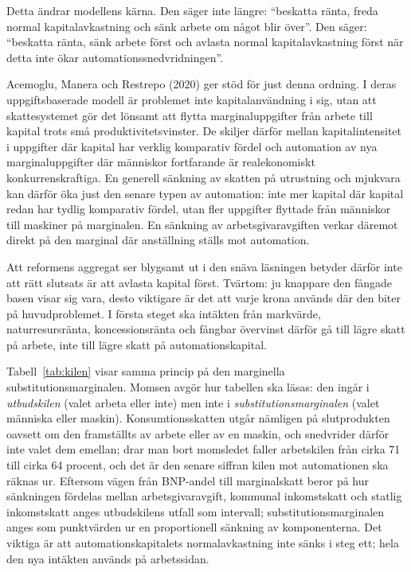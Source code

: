 \documentclass[11pt]{article}
\begin{document}
Detta ändrar modellens kärna. Den säger inte längre: \enquote{beskatta ränta, freda normal kapitalavkastning och sänk arbete om något blir över}. Den säger: \enquote{beskatta ränta, sänk arbete först och avlasta normal kapitalavkastning först när detta inte ökar automationssnedvridningen}.

Acemoglu, Manera och Restrepo (2020) ger stöd för just denna ordning. I deras uppgiftsbaserade modell är problemet inte kapitalanvändning i sig, utan att skattesystemet gör det lönsamt att flytta marginaluppgifter från arbete till kapital trots små produktivitetsvinster. De skiljer därför mellan kapitalintensitet i uppgifter där kapital har verklig komparativ fördel och automation av nya marginaluppgifter där människor fortfarande är realekonomiskt konkurrenskraftiga. En generell sänkning av skatten på utrustning och mjukvara kan därför öka just den senare typen av automation: inte mer kapital där kapital redan har tydlig komparativ fördel, utan fler uppgifter flyttade från människor till maskiner på marginalen. En sänkning av arbetsgivaravgiften verkar däremot direkt på den marginal där anställning ställs mot automation.

Att reformens aggregat ser blygsamt ut i den snäva läsningen betyder därför inte att rätt slutsats är att avlasta kapital först. Tvärtom: ju knappare den fångade basen visar sig vara, desto viktigare är det att varje krona används där den biter på huvudproblemet. I första steget ska intäkten från markvärde, naturresursränta, koncessionsränta och fångbar övervinst därför gå till lägre skatt på arbete, inte till lägre skatt på automationskapital.

Tabell~\ref{tab:kilen} visar samma princip på den marginella substitutionsmarginalen. Momsen avgör hur tabellen ska läsas: den ingår i \emph{utbudskilen} (valet arbeta eller inte) men inte i \emph{substitutionsmarginalen} (valet människa eller maskin). Konsumtionsskatten utgår nämligen på slutprodukten oavsett om den framställts av arbete eller av en maskin, och snedvrider därför inte valet dem emellan; drar man bort momsledet faller arbetskilen från cirka 71 till cirka 64 procent, och det är den senare siffran kilen mot automationen ska räknas ur. Eftersom vägen från BNP-andel till marginalskatt beror på hur sänkningen fördelas mellan arbetsgivaravgift, kommunal inkomstskatt och statlig inkomstskatt anges utbudskilens utfall som intervall; substitutionsmarginalen anges som punktvärden ur en proportionell sänkning av komponenterna. Det viktiga är att automationskapitalets normalavkastning inte sänks i steg ett; hela den nya intäkten används på arbetssidan.
\end{document}
